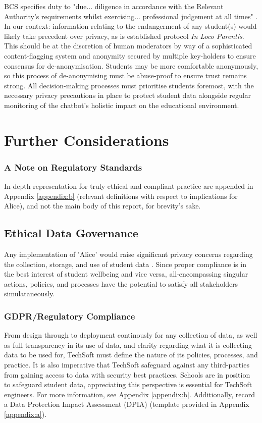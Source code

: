 \documentclass[14pt,a4paper]{article}
\begin{document}
\begin{multicols}{2}
BCS specifies duty to "due... diligence in accordance with the Relevant Authority's requirements whilst exercising... professional judgement at all times" \textit{\parencite[p. 2]{BCS2024}}.
In our context: information relating to the endangerment of any student(s) would likely take precedent over privacy, as is established protocol \textit{In Loco Parentis}.
This should be at the discretion of human moderators by way of a sophisticated content-flagging system and anonymity secured by multiple key-holders to ensure consensus for de-anonymisation.
Students may be more comfortable anonymously, so this process of de-anonymising must be abuse-proof to ensure trust remains strong.
All decision-making processes must prioritise students foremost, with the necessary privacy precautions in place to protect student data alongside regular monitoring of the chatbot's holistic impact on the educational environment.

\section{Further Considerations}

\subsubsection*{A Note on Regulatory Standards}
In-depth representation for truly ethical and compliant practice are appended in Appendix \ref{appendix:b} (relevant definitions with respect to implications for Alice), and not the main body of this report, for brevity's sake.

\subsection{Ethical Data Governance}
Any implementation of 'Alice' would raise significant privacy concerns regarding the collection, storage, and use of student data \textit{\parencite[pp. 366-370]{Annus2023}}.
Since proper compliance is in the best interest of student wellbeing and vice versa, all-encompassing singular actions, policies, and processes have the potential to satisfy all stakeholders simulataneously.

\subsubsection{GDPR/Regulatory Compliance}
From design through to deployment continously for any collection of data, as well as full transparency in its use of data, and clarity regarding what it is collecting data to be used for, TechSoft must define the nature of its policies, processes, and practice. It is also imperative that TechSoft safeguard against any third-parties from gaining access to data with security best practices. Schools are in position to safeguard student data, appreciating this perspective is essential for TechSoft engineers. For more information, see Appendix \ref{appendix:b}. Additionally, record a Data Protection Impact Assessment (DPIA) (template provided in Appendix \ref{appendix:a}).


\end{multicols}
\end{document}
